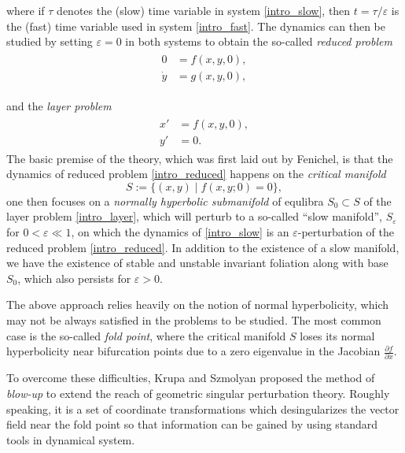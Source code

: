 \documentclass[letterpaper,11pt]{article}
\newcommand{\eps}{\varepsilon}
\numberwithin{equation}{section}
\theoremstyle{plain}
\begin{document}
where if $\tau$ denotes the (slow) time variable in system \eqref{intro_slow}, then $t = \tau/\eps$ is the (fast) time variable used in system \eqref{intro_fast}. The dynamics can then be studied by setting $\eps = 0$ in both systems to obtain the so-called \textit{reduced problem}
\begin{align}\label{intro_reduced}
\begin{split}
0 &=  f(x,y,0),\\
\dot{y} &=   g(x,y,0),   
\end{split}
\end{align}

and the \textit{layer problem}
\begin{align}\label{intro_layer}
\begin{split}
x' &=  f(x,y,0),\\
y' &=  0. 
\end{split}
\end{align}
The basic premise of the theory, which was first laid out by Fenichel, is that the dynamics of reduced problem \eqref{intro_reduced} happens on the \textit{critical manifold}
\[
S:=  \{ (x,y) \mid f(x,y;0) = 0 \},
\]
one then focuses on a \textit{normally hyperbolic submanifold} of equlibra $S_0 \subset S$ of the layer problem \eqref{intro_layer}, which will perturb to a so-called ``slow manifold'', $S_\eps$ for $0<\eps \ll 1$, on which the dynamics of \eqref{intro_slow} is an $\eps$-perturbation of the reduced problem \eqref{intro_reduced}. In addition to the existence of a slow manifold, we have the existence of stable and unstable invariant foliation along with base $S_0$, which also persists for $\eps>0$.

The above approach relies heavily on the notion of normal hyperbolicity, which may not be always satisfied in the problems to be studied. The most common case is the so-called \textit{fold point}, where the critical manifold $S$ loses its normal hyperbolicity near bifurcation points due to a zero eigenvalue in the Jacobian $\frac{\partial f }{\partial x}$.

To overcome these difficulties, Krupa and Szmolyan proposed the method of \textit{blow-up} to extend the reach of geometric singular perturbation theory. Roughly speaking, it is a set of coordinate transformations which desingularizes the vector field near the fold point so that information can be gained by using standard tools in dynamical system.
\end{document}
